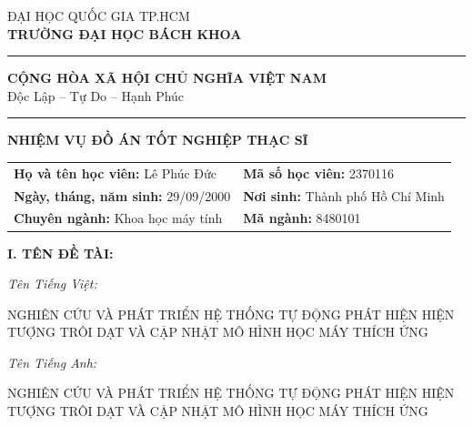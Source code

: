 \newpage
\thispagestyle{empty}

\noindent
\begin{minipage}[t]{0.43\textwidth}
    \centering
    {\fontsize{9pt}{10pt}\selectfont ĐẠI HỌC QUỐC GIA TP.HCM}\\
    {\fontsize{9pt}{10pt}\selectfont \textbf{TRƯỜNG ĐẠI HỌC BÁCH KHOA}}\\
    \rule{5cm}{0.4pt}
\end{minipage}
\hfill
\begin{minipage}[t]{0.53\textwidth}
    \centering
    {\fontsize{9pt}{10pt}\selectfont  \textbf{CỘNG HÒA XÃ HỘI CHỦ NGHĨA VIỆT NAM}}\\
    {\fontsize{9pt}{10pt}\selectfont  Độc Lập -- Tự Do -- Hạnh Phúc}\\
    \rule{5cm}{0.4pt}
\end{minipage}

\vspace{1cm}

\begin{center}
    \Large \textbf{NHIỆM VỤ ĐỒ ÁN TỐT NGHIỆP THẠC SĨ}
\end{center}

\vspace{0.5cm}

\fontsize{13pt}{15pt}\selectfont

\noindent

\begin{tabular}{l l}
\textbf{Họ và tên học viên:} Lê Phúc Đức & \textbf{Mã số học viên:} 2370116\\
\textbf{Ngày, tháng, năm sinh:} 29/09/2000 & \textbf{Nơi sinh:} Thành phố Hồ Chí Minh\\
\textbf{Chuyên ngành:} Khoa học máy tính & \textbf{Mã ngành:} 8480101 \\
\end{tabular}

\vspace{0.7cm}

\begin{flushleft}

\noindent \textbf{I. \hspace{1mm} TÊN ĐỀ TÀI:}

\textit{Tên Tiếng Việt:}

NGHIÊN CỨU VÀ PHÁT TRIỂN HỆ THỐNG TỰ ĐỘNG PHÁT HIỆN HIỆN TƯỢNG TRÔI DẠT VÀ CẬP NHẬT MÔ HÌNH HỌC MÁY THÍCH ỨNG

\textit{Tên Tiếng Anh:}

NGHIÊN CỨU VÀ PHÁT TRIỂN HỆ THỐNG TỰ ĐỘNG PHÁT HIỆN HIỆN TƯỢNG TRÔI DẠT VÀ CẬP NHẬT MÔ HÌNH HỌC MÁY THÍCH ỨNG

\end{flushleft}

